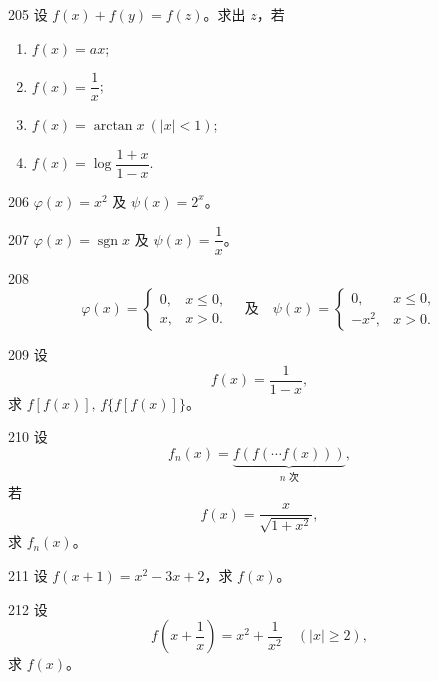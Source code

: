\begin{prob}[L]{205}
设 $f(x) + f(y) = f(z)$。求出 $z$，若
\begin{enumerate}[label=(\alph*), itemsep=2pt, topsep=3pt]
\item $f(x) = ax$;
\item $f(x) = \dfrac{1}{x}$;
\item $f(x) = \arctan x\ (|x| < 1)$;
\item $f(x) = \log\dfrac{1 + x}{1 - x}$.
\end{enumerate}
\end{prob}


\begin{prob}[M]{206}
$\varphi(x) = x^2$ 及 $\psi(x) = 2^x$。
\end{prob}

\begin{prob}[M]{207}
$\varphi(x) = \operatorname{sgn} x$ 及 $\psi(x) = \dfrac{1}{x}$。
\end{prob}

\begin{prob}[M]{208}
\[
\varphi(x) = \begin{cases}
0, & x \leqslant 0, \\
x, & x > 0.
\end{cases}
\quad \text{及} \quad
\psi(x) = \begin{cases}
0, & x \leqslant 0, \\
-x^2, & x > 0.
\end{cases}
\]
\end{prob}

\begin{prob}[M]{209}
设
\[
f(x) = \frac{1}{1 - x},
\]
求 $f[f(x)],\, f\{f[f(x)]\}$。
\end{prob}

\begin{prob}[M]{210}
设
\[
f_n(x) = \underbrace{f(f(\cdots f(x)))}_{n\text{ 次}},
\]
若
\[
f(x) = \frac{x}{\sqrt{1 + x^2}},
\]
求 $f_n(x)$。
\end{prob}

\begin{prob}[S]{211}
设 $f(x + 1) = x^2 - 3x + 2$，求 $f(x)$。
\end{prob}

\begin{prob}[M]{212}
设
\[
f\!\left(x + \frac{1}{x}\right) = x^2 + \frac{1}{x^2} \quad (|x| \geqslant 2),
\]
求 $f(x)$。
\end{prob}

